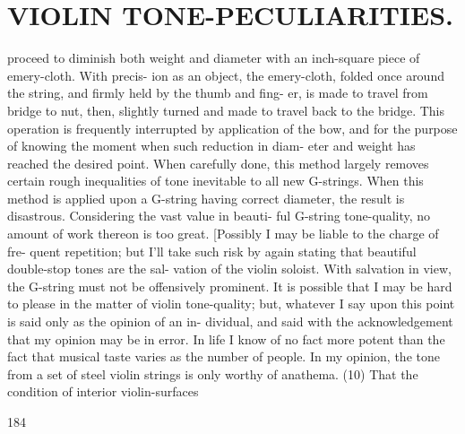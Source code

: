 \documentclass{article}
\begin{document}
\section*{VIOLIN TONE-PECULIARITIES.}
proceed to diminish both weight and diameter with an inch-square piece of emery-cloth. With precis- ion as an object, the emery-cloth, folded once around the string, and firmly held by the thumb and fing- er, is made to travel from bridge to nut, then, slightly turned and made to travel back to the bridge. This operation is frequently interrupted by application of the bow, and for the purpose of knowing the moment when such reduction in diam- eter and weight has reached the desired point. When carefully done, this method largely removes certain rough inequalities of tone inevitable to all new G-strings. When this method is applied upon a G-string having correct diameter, the result is disastrous. Considering the vast value in beauti- ful G-string tone-quality, no amount of work thereon is too great. [Possibly I may be liable to the charge of fre- quent repetition; but I'll take such risk by again stating that beautiful double-stop tones are the sal- vation of the violin soloist. With salvation in view, the G-string must not be offensively prominent. It is possible that I may be hard to please in the matter of violin tone-quality; but, whatever I say upon this point is said only as the opinion of an in- dividual, and said with the acknowledgement that my opinion may be in error. In life I know of no fact more potent than the fact that musical taste varies as the number of people. In my opinion, the tone from a set of steel violin strings is only worthy of anathema. (10) That the condition of interior violin-surfaces

184
\end{document}
